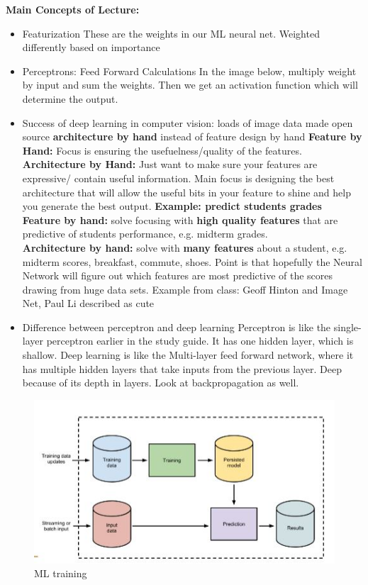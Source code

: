 \documentclass{article}
\begin{document}
\noindent \textbf{Main Concepts of Lecture:}
\begin{itemize}
    \item Featurization
        \subitem These are the weights in our ML neural net. Weighted differently based on importance
    \item Perceptrons: Feed Forward Calculations
        \subitem In the image below, multiply weight by input and sum the weights. 
        \subitem Then we get an activation function which will determine the output. 
    \item Success of deep learning in computer vision: loads of image data made open source \textbf{architecture by hand} instead of feature design by hand
        \subitem \textbf{Feature by Hand:} Focus is ensuring the usefuelness/quality of the features. 
        \subitem \textbf{Architecture by Hand:} Just want to make sure your features are expressive/ contain useful information. Main focus is designing the best architecture that will allow the useful bits in your feature to shine and help you generate the best output.
        \subitem \textbf{Example: predict students grades} \\
        \textbf{Feature by hand:} solve focusing with \textbf{high quality features} that are predictive of students performance, e.g. midterm grades. \\
        \textbf{Architecture by hand:} solve with \textbf{many features} about a student, e.g. midterm scores, breakfast, commute, shoes. 
        \subitem Point is that hopefully the Neural Network will figure out which features are most predictive of the scores drawing from huge data sets. 
        \subitem Example from class: Geoff Hinton and Image Net, Paul Li described as cute
    \item Difference between perceptron and deep learning
        \subitem Perceptron is like the single-layer perceptron earlier in the study guide. It has one hidden layer, which is shallow. 
        \subitem Deep learning is like the Multi-layer feed forward network, where it has multiple hidden layers that take inputs from the previous layer. Deep because of its depth in layers. Look at backpropagation as well. 
\end{itemize}
\begin{figure}[htp]
\centering
\includegraphics[width=15cm]{images/MLconcept.JPG}
\caption{ML training}
\label{fig: ML}
\end{figure}
\end{document}
